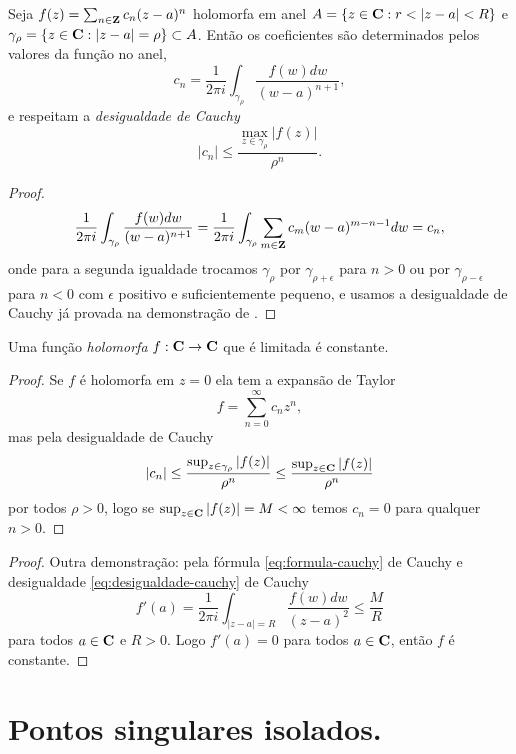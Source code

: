 \begin{teorema}
Seja $f(z) = \sum_{n\in\mathbf{Z}} c_n (z-a)^n$ holomorfa em anel
$A = \{ z\in\mathbf{C} : r < |z-a| < R \}$ e $\gamma_\rho = \{ z\in\mathbf{C} : |z-a|=\rho \} \subset A$.
Então os coeficientes são determinados pelos valores da função no anel,
\begin{equation}
c_n = \frac1{2\pi i} \int_{\gamma_\rho} \frac{f(w) dw}{(w-a)^{n+1}},
\end{equation}
e respeitam a \emph{desigualdade de Cauchy}
\begin{equation}
\label{eq:desigualdade-cauchy}
|c_n| \leq \frac{\max_{z\in\gamma_\rho} |f(z)|}{\rho^n}.
\end{equation}
\end{teorema}
\begin{proof}
\[ \frac1{2\pi i} \int_{\gamma_\rho} \frac{f(w) dw}{(w-a)^{n+1}}
 = \frac1{2\pi i} \int_{\gamma_\rho} \sum_{m\in\mathbf{Z}} c_m (w-a)^{m-n-1} dw 
 = c_n, 
\]
onde para a segunda igualdade trocamos $\gamma_\rho$ por $\gamma_{\rho+\epsilon}$ para
$n>0$ ou por $\gamma_{\rho-\epsilon}$ para $n<0$ com $\epsilon$ positivo e suficientemente pequeno,
e usamos a desigualdade de Cauchy já provada na demonstração de .
\end{proof}

\begin{teorema}[Liouville]
\label{t:liouville}
Uma função \emph{holomorfa} $f: \mathbf{C} \to \mathbf{C}$ que é limitada é constante.
\end{teorema}
\begin{proof}
Se $f$ é holomorfa em $z=0$ ela tem a expansão de Taylor
\[ f = \sum_{n=0}^\infty c_n z^n, \]
mas pela desigualdade de Cauchy
\[ |c_n| \leq  \frac{\sup_{z\in\gamma_\rho} |f(z)|}{\rho^n} \leq \frac{\sup_{z\in\mathbf{C}} |f(z)|}{\rho^n} \]
por todos $\rho > 0$, logo se $\sup_{z\in\mathbf{C}} |f(z)| = M < \infty$ temos $c_n = 0$ para qualquer $n>0$.
\end{proof}
\begin{proof}
Outra demonstração: pela fórmula \eqref{eq:formula-cauchy} de Cauchy
e desigualdade \eqref{eq:desigualdade-cauchy} de Cauchy
\[ f'(a) = \frac{1}{2\pi i} \int_{|z-a|=R} \frac{f(w)dw}{(z-a)^2} \leq \frac{M}{R} \]
para todos $a\in \mathbf{C}$ e $R>0$. Logo $f'(a) = 0$ para todos $a\in \mathbf{C}$, então $f$ é constante.
\end{proof}

\section{Pontos singulares isolados.}

